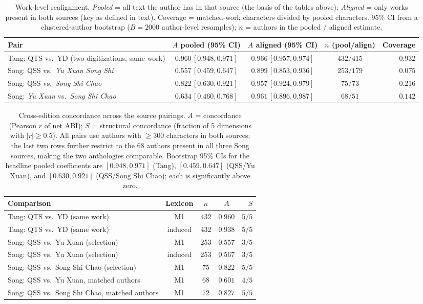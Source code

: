 \documentclass[10pt]{article}
\begin{document}
\begin{table}[H]
\centering\footnotesize
\caption{Work-level realignment. \emph{Pooled} = all text the author has in that
source (the basis of the tables above); \emph{Aligned} = only works present in both
sources (key as defined in text). Coverage = matched-work characters divided by
pooled characters. 95\% CI from a clustered-author bootstrap ($B{=}2000$ author-level resamples); $n$ = authors in the pooled / aligned estimate.}
\label{tab:realign}
\begin{tabular}{p{5.4cm}cccr}
\toprule
Pair & $A$ pooled (95\% CI) & $A$ aligned (95\% CI) & $n$ (pool/align) & Coverage\\
\midrule
Tang: QTS vs.\ YD (two digitizations, same work) & $0.960\,[0.948,0.971]$ & $0.966\,[0.957,0.974]$ & $432/415$ & $0.932$\\
Song: QSS vs.\ \emph{Yu Xuan Song Shi} & $0.557\,[0.459,0.647]$ & $0.899\,[0.853,0.936]$ & $253/179$ & $0.075$\\
Song: QSS vs.\ \emph{Song Shi Chao} & $0.822\,[0.630,0.921]$ & $0.957\,[0.924,0.979]$ & $75/73$ & $0.216$\\
Song: \emph{Yu Xuan} vs.\ \emph{Song Shi Chao} & $0.634\,[0.460,0.768]$ & $0.961\,[0.896,0.987]$ & $68/51$ & $0.142$\\
\bottomrule
\end{tabular}
\end{table}
\begin{table}[H]
\centering\footnotesize
\caption{Cross-edition concordance across the source pairings. $A$ = concordance
(Pearson $r$ of net ABI); $S$ = structural concordance (fraction of 5 dimensions
with $|r|{\ge}0.5$). All pairs use authors with $\ge$300 characters in both sources;
the last two rows further restrict to the 68 authors present in all three Song
sources, making the two anthologies comparable. Bootstrap 95\% CIs for the headline pooled coefficients are $[0.948,0.971]$ (Tang), $[0.459,0.647]$ (QSS/Yu Xuan), and $[0.630,0.921]$ (QSS/Song Shi Chao); each is significantly above zero.}
\label{tab:invariance}
\begin{tabular}{lcccr}
\toprule
Comparison & Lexicon & $n$ & $A$ & $S$\\
\midrule
Tang: QTS vs.\ YD (same work) & M1 & 432 & $0.960$ & $5/5$\\
Tang: QTS vs.\ YD (same work) & induced & 432 & $0.938$ & $5/5$\\
Song: QSS vs.\ Yu Xuan (selection) & M1 & 253 & $0.557$ & $3/5$\\
Song: QSS vs.\ Yu Xuan (selection) & induced & 253 & $0.567$ & $3/5$\\
Song: QSS vs.\ Song Shi Chao (selection) & M1 & 75 & $0.822$ & $5/5$\\
Song: QSS vs.\ Yu Xuan, matched authors & M1 & 68 & $0.601$ & $4/5$\\
Song: QSS vs.\ Song Shi Chao, matched authors & M1 & 72 & $0.827$ & $5/5$\\
\bottomrule
\end{tabular}
\end{table}
\end{document}
